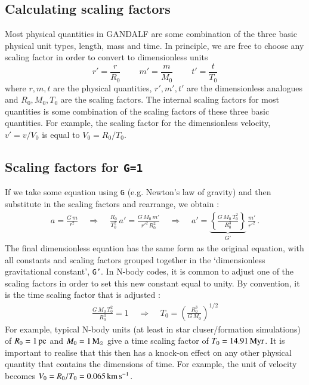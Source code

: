 \documentclass[a4paper]{article}
\newcommand{\var}[1]{\texttt{#1}}
\begin{document}
\subsection{Calculating scaling factors}
Most physical quantities in GANDALF are some combination of the three basic physical unit types, length, mass and time.  In principle, we are free to choose any scaling factor in order to convert to dimensionless units
\begin{equation}
r' = \frac{r}{R_0} \;\;\;\;\;\;\;\;
m' = \frac{m}{M_0} \;\;\;\;\;\;\;\;
t' = \frac{t}{T_0}
\end{equation}
where $r, m, t$ are the physical quantities, $r', m', t'$ are the dimensionless analogues and $R_0, M_0, T_0$ are the scaling factors.  The internal scaling factors for most quantities is some combination of the scaling factors of these three basic quantities.  For example, the scaling factor for the dimensionless velocity, $v' = v/V_0$ is equal to $V_0 = R_0/T_0$.


\subsection{Scaling factors for \var{G=1}}
If we take some equation using \var{G} (e.g. Newton's law of gravity) and then substitute in the scaling factors and rearrange, we obtain : 
\begin{eqnarray}
a = \frac{G\,m}{r^2} \;\;\;\; \Rightarrow \;\;\;\;
\frac{R_0}{T_0^2}\,a' = \frac{G\,M_0\,m'}{{r'}^2\,R_0^2} \;\;\;\; \Rightarrow \;\;\;\; a' = \underbrace{\left\{\frac{G\,M_0\,T_0^2}{R_0^3} \right\}}_{G'}\,\frac{m'}{{r'}^2}\,.
\end{eqnarray}
The final dimensionless equation has the same form as the original equation, with all constants and scaling factors grouped together in the `dimensionless gravitational constant', \var{G'}.  In N-body codes, it is common to adjust one of the scaling factors in order to set this new constant equal to unity.  By convention, it is the time scaling factor that is adjusted : 
\begin{eqnarray}
\frac{G\,M_0\,T_0^2}{R_0^3} = 1 \;\;\;\; \Rightarrow \;\;\;\;T_0 = \left( \frac{R_0^3}{G\,M_0} \right)^{1/2}
\end{eqnarray}
For example, typical N-body units (at least in star cluser/formation simulations) of $R_0 = 1\,{\rm pc}$ and $M_0 = 1\,{\rm M}_{\odot}$ give a time scaling factor of $T_0 = 14.91\,{\rm Myr}$.  It is important to realise that this then has a knock-on effect on any other physical quantity that contains the dimensions of time.  For example, the unit of velocity becomes $V_0 = R_0/T_0 = 0.065\,{\rm km\,s^{-1}}$.
\end{document}
